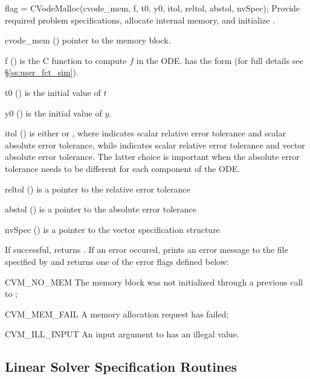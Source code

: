 {
  flag = CVodeMalloc(cvode\_mem, f, t0, y0, itol, reltol, abstol, nvSpec);
}
{
  Provide required problem specifications, allocate internal memory,
  and initialize {\cvodes}.
}
{
  \begin{args}[abstol]
  \item[cvode\_mem] ()
    pointer to the {\cvodes} memory block.
  \item[f] ()
    is the C function to compute $f$ in the ODE.  has the form 
     (for full details see \S\ref{ss:user_fct_sim}).
  \item[t0] ()
    is the initial value of $t$
  \item[y0] ()
    is the initial value of $y$. 
  \item[itol] () 
    is either  or , where  indicates scalar relative error 
    tolerance and scalar absolute error tolerance, while  indicates scalar
    relative error tolerance and vector absolute error tolerance. 
    The latter choice is important when the absolute error tolerance needs to
    be different for each component of the ODE. 
  \item[reltol] ()
    is a pointer to the relative error tolerance
  \item[abstol] ()
    is a pointer to the absolute error tolerance
  \item[nvSpec] ()
    is a pointer to the vector specification structure
  \end{args}
}
{
  If successful,  returns .
  If an error occured,  prints an error message to the
  file specified by  and returns one of the error flags
  defined below:
  \begin{args}
  \item[CVM\_NO\_MEM] 
    The {\cvodes} memory block was not initialized through a previous call to ;
  \item[CVM\_MEM\_FAIL] 
    A memory allocation request has failed;
  \item[CVM\_ILL\_INPUT] 
    An input argument to  has an illegal value.
  \end{args}
}
{}

\subsection{Linear Solver Specification Routines}\label{ss:lin_solv_init}


